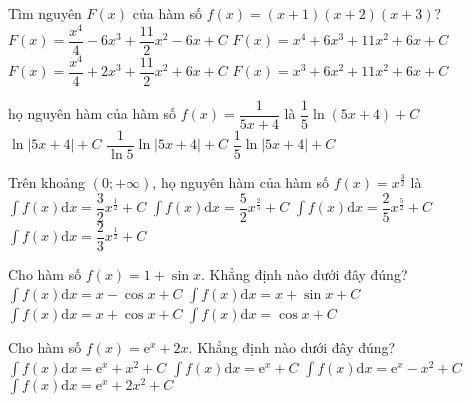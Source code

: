 \begin{ex}
	Tìm nguyên $F(x)$ của hàm số $f(x)=\left(x+1\right)\left(x+2\right)\left(x+3\right)?$ 
	\choice
	{$F(x)=\dfrac{x^4}{4}-6x^3+\dfrac{11}{2}{x^2}-6x+C$}
	{$F(x)=x^4+6x^3+11x^2+6x+C$}
	{\True $F(x)=\dfrac{x^4}{4}+2x^3+\dfrac{11}{2}{x^2}+6x+C$}
	{$F(x)=x^3+6x^2+11x^2+6x+C$}
\end{ex}
\begin{ex}
	họ nguyên hàm của hàm số $ f(x)=\dfrac{1}{5x+4}$ là
	\choice
	{$\dfrac{1}{5}\ln \left(5x+4\right)+C$}
	{$\ln \left| 5x+4\right|+C$}
	{$\dfrac{1}{\ln 5}\ln \left| 5x+4\right|+C$}
	{\True $\dfrac{1}{5}\ln \left| 5x+4\right|+C$}
\end{ex}
\begin{ex}
	Trên khoảng $\left(0;+\infty\right)$, họ nguyên hàm của hàm số $f(x)=x^{\frac{3}{2}}$ là
	\choice
	{$\displaystyle\int{f(x)\mathrm{d}x=\dfrac{3}{2}{x^{\frac{1}{2}}}}+C$}
	{$\displaystyle\int{f(x)\mathrm{d}x=\dfrac{5}{2}{x^{\frac{2}{5}}}}+C$}
	{\True $\displaystyle\int{f(x)\mathrm{d}x=\dfrac{2}{5}{x^{\frac{5}{2}}}}+C$}
	{$\displaystyle\int{f(x)\mathrm{d}x=\dfrac{2}{3}{x^{\frac{1}{2}}}}+C$}
\end{ex}
\begin{ex}
	Cho hàm số $ f(x)=1+\sin x$. Khẳng định nào dưới đây đúng?
	\choice
	{\True $\displaystyle\int{f(x)\mathrm{d}x}=x-\cos x+C$} {$\displaystyle\int{f(x)\mathrm{d}x}=x+\sin x+C$} {$\displaystyle\int{f(x)\mathrm{d}x}=x+\cos x+C$} {$\displaystyle\int{f(x)\mathrm{d}x}=\cos x+C$}
\end{ex}
\begin{ex}
	[Mã 101 - 2022]%
	Cho hàm số $ f(x)=\mathrm{e}^x+2x.$ Khẳng định nào dưới đây đúng?
	\choice
	{\True $\displaystyle\int{f(x)}\mathrm{d}x=\mathrm{e}^x+x^2+C$}
	{$\displaystyle\int{f(x)}\mathrm{d}x=\mathrm{e}^x+C$}
	{$\displaystyle\int{f(x)}\mathrm{d}x=\mathrm{e}^x-x^2+C$}
	{$\displaystyle\int{f(x)}\mathrm{d}x=\mathrm{e}^x+2x^2+C$}
\end{ex}
